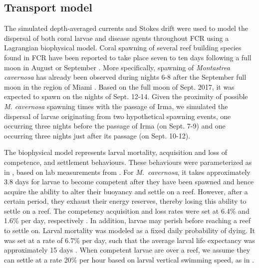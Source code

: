 \documentclass[fleqn,10pt]{wlscirep}
\newcommand{\modif}[1]{{#1}}
\begin{document}
\subsection{Transport model}
The simulated depth-averaged currents and Stokes drift were used to model the dispersal of both coral larvae and disease agents throughout FCR using a Lagrangian biophysical model. \modif{Coral spawning of several reef building species found in FCR have been reported to take place seven to ten days following a full moon in August or September \citep{hagman1998timing}. More specifically, spawning of \textit{Montastrea cavernosa} has already been observed during nights 6-8 after the September full moon in the region of Miami \citep{bright2021quicklook}}. \modif{Based on} the full moon of Sept. 2017, it was expected to spawn on the nights of Sept. \modif{12-14}. Given the proximity of \modif{possible \textit{M. cavernosa} spawning times} with the passage of Irma, we simulated the dispersal of larvae originating from two hypothetical spawning events, one occurring three nights before the passage of Irma (on Sept. 7-9) and one occurring three nights just after its passage (on Sept. 10-12).

The biophysical model represents larval mortality, acquisition and loss of competence, and settlement behaviours. \modif{These behaviours were parameterized as in \cite{Frys2020}, based on lab measurements from \cite{Kuba2016}}. For \modif{\it M.~cavernosa}, it takes approximately 3.8 days for larvae to become competent after they have been spawned and hence acquire the ability to alter their buoyancy and settle on a reef. However, after a certain period, they exhaust their energy reserves, thereby losing this ability to settle on a reef. The competency acquisition and loss rates were set at 6.4\% and 1.6\% per day, respectively \citep{Kuba2016}. In addition, larvae may perish before reaching a reef to settle on. Larval mortality was modeled as a fixed daily probability of dying. It was set at a rate of 6.7\% per day, such that the average larval life expectancy was approximately 15 days \citep{Kuba2016}. When competent larvae are over a reef, we assume \modif{they} can settle at a rate 20\% per hour \modif{based on larval vertical swimming speed, as in \cite{king2023larval}}.
\end{document}
